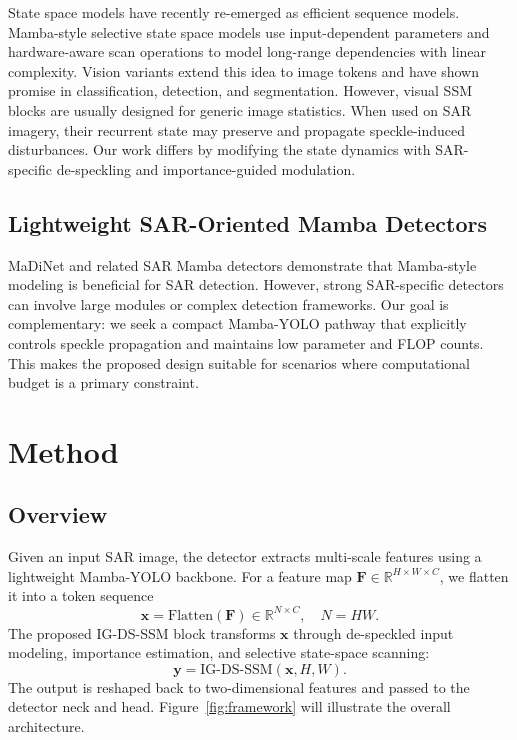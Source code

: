 \documentclass[letterpaper]{article}
\begin{document}
State space models have recently re-emerged as efficient sequence models. Mamba-style selective state space models use input-dependent parameters and hardware-aware scan operations to model long-range dependencies with linear complexity. Vision variants extend this idea to image tokens and have shown promise in classification, detection, and segmentation. However, visual SSM blocks are usually designed for generic image statistics. When used on SAR imagery, their recurrent state may preserve and propagate speckle-induced disturbances. Our work differs by modifying the state dynamics with SAR-specific de-speckling and importance-guided modulation.

\subsection{Lightweight SAR-Oriented Mamba Detectors}

MaDiNet and related SAR Mamba detectors demonstrate that Mamba-style modeling is beneficial for SAR detection. However, strong SAR-specific detectors can involve large modules or complex detection frameworks. Our goal is complementary: we seek a compact Mamba-YOLO pathway that explicitly controls speckle propagation and maintains low parameter and FLOP counts. This makes the proposed design suitable for scenarios where computational budget is a primary constraint.

\section{Method}

\subsection{Overview}

Given an input SAR image, the detector extracts multi-scale features using a lightweight Mamba-YOLO backbone. For a feature map $\mathbf{F}\in\mathbb{R}^{H\times W\times C}$, we flatten it into a token sequence
\begin{equation}
  \mathbf{x}=\mathrm{Flatten}(\mathbf{F})\in\mathbb{R}^{N\times C}, \quad N=HW.
\end{equation}
The proposed IG-DS-SSM block transforms $\mathbf{x}$ through de-speckled input modeling, importance estimation, and selective state-space scanning:
\begin{equation}
  \mathbf{y}=\mathrm{IG\mbox{-}DS\mbox{-}SSM}(\mathbf{x}, H, W).
\end{equation}
The output is reshaped back to two-dimensional features and passed to the detector neck and head. Figure~\ref{fig:framework} will illustrate the overall architecture.
\end{document}
